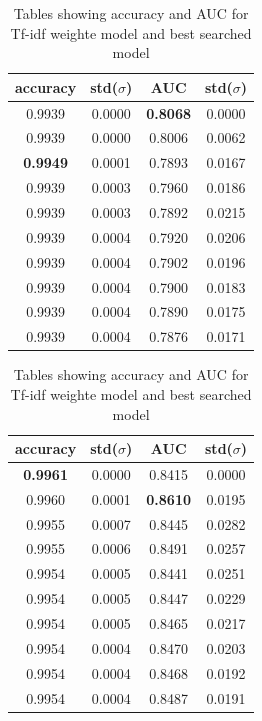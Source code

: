 \begin{table}
  \begin{subtable}{.5\linewidth}
    \centering
    \begin{tabular}{cccc} \toprule
      accuracy        & std($\sigma$) & AUC             & std($\sigma$) \\ \midrule
      0.9939          & 0.0000        & \textbf{0.8068} & 0.0000 \\
      0.9939          & 0.0000        & 0.8006          & 0.0062 \\
      \textbf{0.9949} & 0.0001        & 0.7893          & 0.0167 \\
      0.9939          & 0.0003        & 0.7960          & 0.0186 \\
      0.9939          & 0.0003        & 0.7892          & 0.0215 \\ \midrule
      0.9939          & 0.0004        & 0.7920          & 0.0206 \\
      0.9939          & 0.0004        & 0.7902          & 0.0196 \\
      0.9939          & 0.0004        & 0.7900          & 0.0183 \\
      0.9939          & 0.0004        & 0.7890          & 0.0175 \\
      0.9939          & 0.0004        & 0.7876          & 0.0171 \\ \bottomrule
    \end{tabular}
      \caption{with tfidf weighted model}
      \label{tab:tfidf_model}
  \end{subtable}
  \begin{subtable}{.5\linewidth}
    \centering
    \begin{tabular}{cccc} \toprule
      accuracy        & std($\sigma$) & AUC             & std($\sigma$) \\ \midrule
      \textbf{0.9961} & 0.0000        & 0.8415          & 0.0000 \\
      0.9960          & 0.0001        & \textbf{0.8610} & 0.0195 \\
      0.9955          & 0.0007        & 0.8445          & 0.0282 \\
      0.9955          & 0.0006        & 0.8491          & 0.0257 \\
      0.9954          & 0.0005        & 0.8441          & 0.0251 \\ \midrule
      0.9954          & 0.0005        & 0.8447          & 0.0229 \\
      0.9954          & 0.0005        & 0.8465          & 0.0217 \\
      0.9954          & 0.0004        & 0.8470          & 0.0203 \\
      0.9954          & 0.0004        & 0.8468          & 0.0192 \\
      0.9954          & 0.0004        & 0.8487          & 0.0191 \\ \bottomrule
    \end{tabular}
      \caption{best model}
      \label{tab:best_model}
  \end{subtable}
\caption{Tables showing accuracy and AUC for Tf-idf weighte model and best searched model}
\label{tab:all_data_tables}
\end{table}
